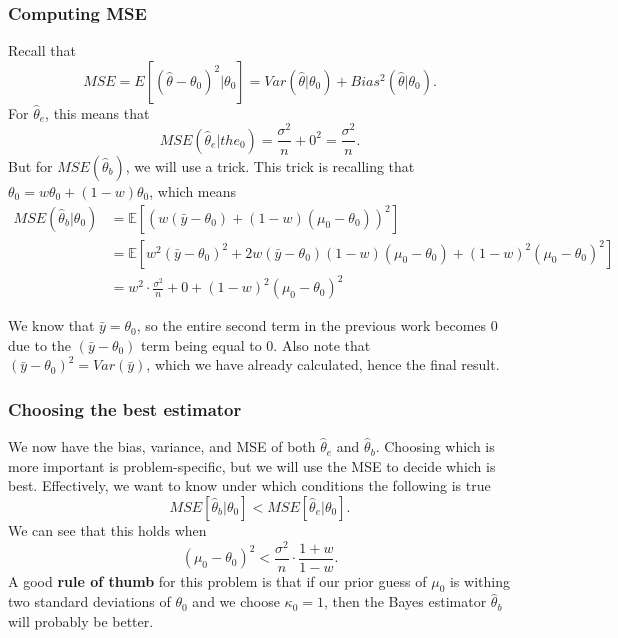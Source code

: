 \documentclass[titlepage, 12pt, leqno]{article}
\begin{document}
\subsubsection{Computing MSE}
Recall that 
\[
    MSE = E[(\hat \theta-\theta_{0})^{2} | \theta_{0}] = Var(\hat \theta|
    \theta_{0}) + Bias^{2}(\hat \theta | \theta_{0}).
\]
For $\hat \theta_{e}$, this means that
\[
MSE(\hat \theta_{e}|the_{0}) = \frac{\sigma^{2}}{n} + 0^{2} = 
\frac{\sigma^{2}}{n}.
\]
But for $MSE(\hat \theta_{b})$, we will use a trick. This trick is recalling
that $\theta_{0}= w\theta_{0}+ (1-w)\theta_{0}$, which means
\begin{align*}
    MSE(\hat \theta_{b} | \theta_{0}) &= \mathbb{E}[(w(\bar y - \theta_{0}) + 
    (1-w)(\mu_{0} - \theta_{0}))^{2}] \\
                  &= \mathbb{E}[w^{2}(\bar y- \theta_{0})^{2} + 2w(\bar y -
                  \theta_{0})(1-w)(\mu_{0} - \theta_{0}) + (1-w)^{2}(\mu_{0}-
                  \theta_{0})^{2}] \\
                  &= w^{2}\cdot\frac{\sigma^{2}}{n} + 0 + (1-w)^{2}(\mu_{0} - 
                  \theta_{0})^{2}
\end{align*}
\begin{note}
    We know that $\bar y = \theta_{0}$, so the entire second term in the
    previous work becomes 0 due to the $(\bar y-\theta_{0})$ term being equal
    to 0. Also note that $(\bar y - \theta_{0})^{2} = Var(\bar y)$, which we
    have already calculated, hence the final result.
\end{note}

\subsubsection{Choosing the best estimator}
We now have the bias, variance, and MSE of both $\hat \theta_{e}$ and
$\hat \theta_{b}$. Choosing which is more important is problem-specific, but
we will use the MSE to decide which is best. Effectively, we want to know 
under which conditions the following is true
\[
    MSE[\hat \theta_{b}|\theta_{0}] < MSE[\hat \theta_{e}|\theta_{0}].
\]
We can see that this holds when
\[
    (\mu_{0}-\theta_{0})^{2} < \frac{\sigma^{2}}{n} \cdot \frac{1+w}{1-w}.
\]
A good \textbf{rule of thumb} for this problem is that if our prior guess of
$\mu_{0}$ is withing two standard deviations of $\theta_{0}$ and we choose
$\kappa_{0}=1$, then the Bayes estimator $\hat \theta_{b}$ will probably be
better.
\end{document}

